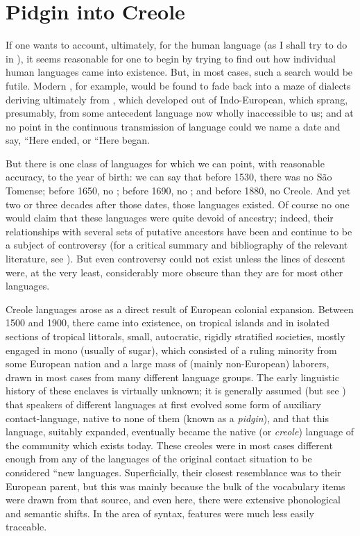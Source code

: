 \chapter{Pidgin into Creole} \label{ch:1}

If one wants to account, ultimately, for the  human language (as I shall try to do in ), it seems reasonable for one to begin by trying to find out how individual human languages came into existence. But, in most cases, such a search would be futile. Mod\-ern , for example, would be found to fade back into a maze of dialects deriving ultimately from , which developed out of Indo-European, which sprang, presumably, from some antecedent language now wholly inaccessible to us; and at no point in the continuous transmission of language could we name a date and say, ``Here  ended, or ``Here  began.{\textquotedbl}

But there is one class of languages for which we can point, with reasonable accuracy, to the year of birth: we can say that before 1530, there was no S\~ao Tomense; before 1650, no ; before 1690, no ; and before 1880, no  Creole. And yet two or three decades after those dates, those languages existed. Of course no one would claim that these languages were quite devoid of ancestry; indeed, their relationships with several sets of putative ancestors have been and continue to be a subject of controversy (for a critical sum\-mary and bibliography of the relevant literature, see \citealt{Bickerton1976}).
But even controversy could not exist unless the lines of descent were, at the very least, considerably more obscure than they are for most other languages.

Creole languages arose as a direct result of European colonial expansion. Between 1500 and 1900, there came into existence, on tropical islands and in isolated sections of tropical littorals, small, autocratic, rigidly stratified societies, mostly engaged in mono (usually of sugar), which consisted of a ruling minority from some European nation and a large mass of (mainly non-European) laborers, drawn in most cases from many different language groups. The early linguistic history of these enclaves is virtually unknown; it is generally assumed (but see \citealt{Alleyne1971,Alleyne1979}) that speakers of different lan\-guages at first evolved some form of auxiliary contact-language, native to none of them (known as a \textit{pidgin}), and that this language, suitably expanded, eventually became the native (or \textit{creole}) language of the community which exists today. These creoles were in most cases different enough from any of the languages of the original contact situation to be considered ``new languages. Superficially, their closest resemblance was to their European parent, but this was mainly because the bulk of the vocabulary items were drawn from that source, and even here, there were extensive phonological and semantic shifts. In the area of syntax, features were much less easily traceable.

